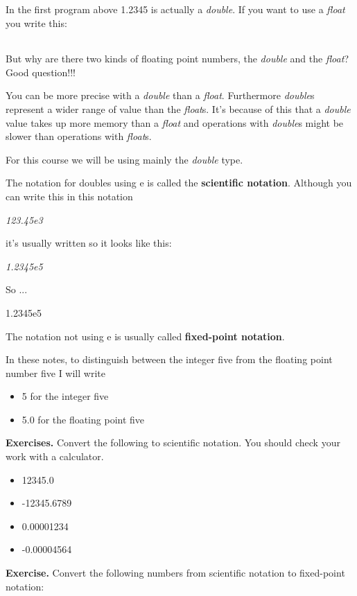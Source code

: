 \documentclass[
]{article}
\providecommand{\tightlist}{%
  \setlength{\itemsep}{0pt}\setlength{\parskip}{0pt}}
\begin{document}
In the first program above 1.2345 is actually a \emph{double}. If you
want to use a \emph{float} you write this:

\begin{longtable}[]{@{}@{}}
\toprule
\endhead
\bottomrule
\end{longtable}

But why are there two kinds of floating point numbers, the \emph{double}
and the \emph{float}? Good question!!!

You can be more precise with a \emph{double} than a \emph{float}.
Furthermore \emph{double}s represent a wider range of value than the
\emph{float}s. It's because of this that a \emph{double} value takes up
more memory than a \emph{float }and operations with \emph{double}s might
be slower than operations with \emph{float}s.

For this course we will be using mainly the \emph{double} type.

The notation for doubles using e is called the \textbf{scientific
notation}. Although you can write this in this notation

\emph{123.45e3}

it's usually written so it looks like this:

\emph{1.2345e5}

So ...

1.2345e5

The notation not using e is usually called \textbf{fixed-point
notation}.

In these notes, to distinguish between the integer five from the
floating point number five I will write

\begin{itemize}
\item
  5 for the integer five
\item
  5.0 for the floating point five
\end{itemize}

\textbf{Exercises.} Convert the following to scientific notation. You
should check your work with a calculator.

\begin{itemize}
\tightlist
\item
  12345.0
\item
  -12345.6789
\item
  0.00001234
\item
  -0.00004564
\end{itemize}

\textbf{Exercise.} Convert the following numbers from scientific
notation to fixed-point notation:
\end{document}
